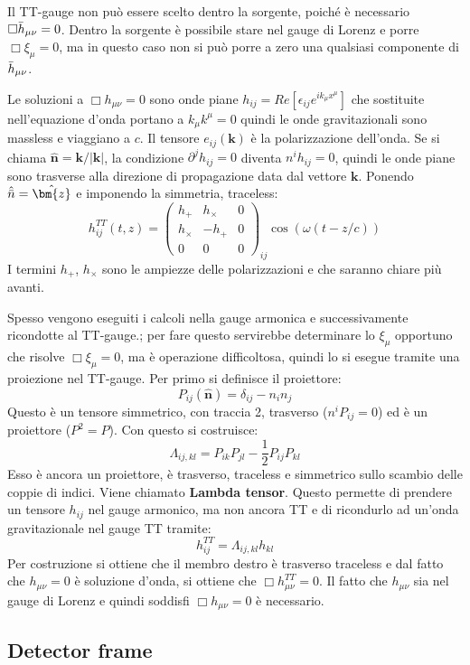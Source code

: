 Il TT-gauge non può essere scelto dentro la sorgente, poiché è necessario $\Box \Bar{h}_{\mu\nu}=0$. Dentro la sorgente è possibile stare nel gauge di Lorenz e porre $\Box \xi_\mu = 0$, ma in questo caso non si può porre a zero una qualsiasi componente di $\Bar{h}_{\mu\nu}$.

Le soluzioni a $\Box h_{\mu\nu}=0$ sono onde piane $h_{ij} = Re\left[\epsilon_{ij}e^{ik_\mu x^\mu}\right]$ che sostituite nell'equazione d'onda portano a $k_\mu k^\mu =0$ quindi le onde gravitazionali sono massless e viaggiano a $c$. Il tensore $e_{ij}(\bm{k})$ è la polarizzazione dell'onda.  Se si chiama $\hat{\bm{n}}= \bm{k}/|\bm{k}|$, la condizione $\partial^jh_{ij}=0$ diventa $n^ih_{ij}=0$, quindi le onde piane sono trasverse alla direzione di propagazione data dal vettore $\bm{k}$. Ponendo $\hat{\Bar{n}}=\hat{\bm{z}}$ e imponendo la simmetria, traceless:
\begin{equation*}
    h_{ij}^{TT}(t,z)= \begin{pmatrix}
        h_+ & h_\times &0\\
        h_\times & - h_+ &0 \\ 
    0 &0 & 0
    \end{pmatrix}_{ij} \cos(\omega (t- z/c))
\end{equation*}
I termini $h_+$, $h_\times$ sono le ampiezze delle polarizzazioni  e  che saranno chiare più avanti.

Spesso vengono eseguiti i calcoli nella gauge armonica e successivamente ricondotte al TT-gauge.; per fare questo servirebbe determinare lo $\xi_\mu$ opportuno che risolve $\Box \xi_\mu = 0$, ma è operazione difficoltosa, quindi lo si esegue tramite una proiezione nel TT-gauge.
Per primo si definisce il proiettore:
\begin{equation}
    P_{ij}(\hat{\bm n}) = \delta_{ij} - n_i n_j
    \label{eq.proiettore_P_ttgauge}
\end{equation}
Questo è un tensore simmetrico, con traccia 2, trasverso ($n^iP_{ij}=0$) ed è un proiettore ($P^2 =P$). Con questo si costruisce:
\begin{equation}
    \Lambda_{ij,kl} = P_{ik}P_{jl} - \frac{1}{2}P_{ij}P_{kl}
    \label{eq.proiettore_lambda}
\end{equation}
Esso è ancora un proiettore, è trasverso, traceless e simmetrico sullo scambio delle coppie di indici. Viene chiamato \textbf{Lambda tensor}. Questo permette di prendere un tensore $h_{ij}$ nel gauge armonico, ma non ancora TT e di ricondurlo ad un'onda gravitazionale nel gauge TT tramite:
\begin{equation}
    h_{ij}^{TT}= \Lambda_{ij,kl}h_{kl}
\end{equation}
Per costruzione si ottiene che il membro destro è trasverso traceless e dal fatto che $h_{\mu\nu}=0$ è soluzione d'onda, si ottiene che $\Box h_{\mu\nu}^{TT}=0$. Il fatto che $h_{\mu\nu}$ sia nel gauge di Lorenz e quindi soddisfi $\Box h_{\mu\nu}=0$ è necessario.




\subsection{Detector frame}

